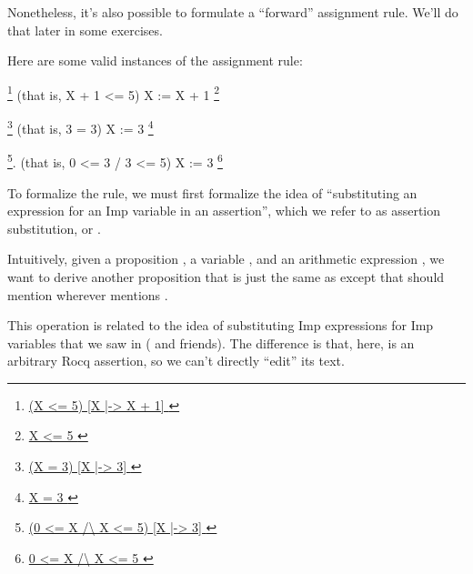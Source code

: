 \documentclass[12pt]{report}
\begin{document}
    Nonetheless, it's also possible to formulate a ``forward'' assignment
    rule.  We'll do that later in some exercises. 

 Here are some valid instances of the assignment rule:


      \footnote{\url{ (X <= 5) [X |-> X + 1] }}         (that is, X + 1 <= 5)
        X := X + 1
      \footnote{\url{ X <= 5 }}


      \footnote{\url{ (X = 3) [X |-> 3] }}              (that is, 3 = 3)
        X := 3
      \footnote{\url{ X = 3 }}


      \footnote{\url{ (0 <= X /\ X <= 5) [X |-> 3] }}.  (that is, 0 <= 3 / 3 <= 5)
        X := 3
      \footnote{\url{ 0 <= X /\ X <= 5 }}


 To formalize the rule, we must first formalize the idea of
    ``substituting an expression for an Imp variable in an assertion'',
    which we refer to as assertion substitution, or .


    Intuitively, given a proposition , a variable , and an
    arithmetic expression , we want to derive another proposition
     that is just the same as  except that  should mention
     wherever  mentions . 

 This operation is related to the idea of substituting Imp
    expressions for Imp variables that we saw in 
    ( and friends). The difference is that, here,
     is an arbitrary Rocq assertion, so we can't directly
    ``edit'' its text. 
\end{document}
